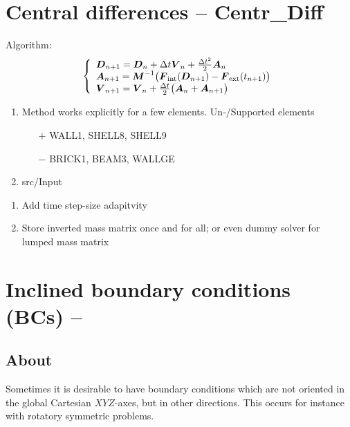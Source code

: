 \section{Central differences -- \ccarat Centr\_Diff}
Algorithm:
\begin{gather*}
  \left\{\begin{array}{l}
     \boldsymbol{D}_{n+1} = \boldsymbol{D}_n + \Delta t \boldsymbol{V}_n + \frac{\Delta t^2}{2} \boldsymbol{A}_n
  \\
     \boldsymbol{A}_{n+1} = \boldsymbol{M}^{-1} \big( 
                     \boldsymbol{F}_{\text{int}}(\boldsymbol{D}_{n+1}) 
                     - \boldsymbol{F}_{\text{ext}}(t_{n+1})
                     \big)
  \\
     \boldsymbol{V}_{n+1} 
               = \boldsymbol{V}_n + \frac{\Delta t}{2} \big( 
               \boldsymbol{A}_n + \boldsymbol{A}_{n+1} \big)
  \end{array}\right.
\end{gather*}
\begin{enumerate}
\item Method works explicitly for a few elements. Un-/Supported elements
  \begin{itemize}
  \item[$+$] WALL1, SHELL8, SHELL9
  \item[$-$] BRICK1, BEAM3, WALLGE
  \end{itemize}
\item src/Input 
\end{enumerate}

\begin{enumerate}
\item Add time step-size adapitvity
\item Store inverted mass matrix once and for all; or even dummy solver for
  lumped mass matrix
\end{enumerate}

\section{Inclined boundary conditions (BCs) -- \ccarat{}}

\subsection{About}
Sometimes it is desirable to have boundary conditions
which are not oriented in the global Cartesian $XYZ$-axes,
but in other directions. This occurs for instance with
rotatory symmetric problems.

